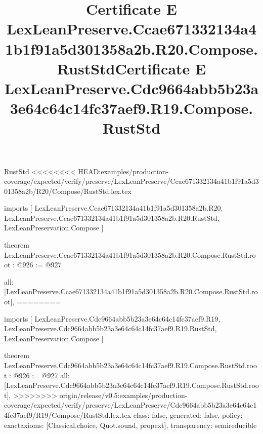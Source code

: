 \begin{lexlean}{RustStd}
<<<<<<<< HEAD:examples/production-coverage/expected/verify/preserve/LexLeanPreserve/Ccae671332134a41b1f91a5d301358a2b/R20/Compose/RustStd.lex.tex
\title{Certificate E LexLeanPreserve.Ccae671332134a41b1f91a5d301358a2b.R20.Compose.RustStd}
\begin{coremodule}
imports [
  LexLeanPreserve.Ccae671332134a41b1f91a5d301358a2b.R20,
  LexLeanPreserve.Ccae671332134a41b1f91a5d301358a2b.R20.RustStd,
  LexLeanPreservation.Compose
]

theorem LexLeanPreserve.Ccae671332134a41b1f91a5d301358a2b.R20.Compose.RustStd.root : @926 := @927 {
  all: [LexLeanPreserve.Ccae671332134a41b1f91a5d301358a2b.R20.Compose.RustStd.root],
========
\title{Certificate E LexLeanPreserve.Cdc9664abb5b23a3e64c64c14fc37aef9.R19.Compose.RustStd}
\begin{coremodule}
imports [
  LexLeanPreserve.Cdc9664abb5b23a3e64c64c14fc37aef9.R19,
  LexLeanPreserve.Cdc9664abb5b23a3e64c64c14fc37aef9.R19.RustStd,
  LexLeanPreservation.Compose
]

theorem LexLeanPreserve.Cdc9664abb5b23a3e64c64c14fc37aef9.R19.Compose.RustStd.root : @926 := @927 {
  all: [LexLeanPreserve.Cdc9664abb5b23a3e64c64c14fc37aef9.R19.Compose.RustStd.root],
>>>>>>>> origin/release/v0.5:examples/production-coverage/expected/verify/preserve/LexLeanPreserve/Cdc9664abb5b23a3e64c64c14fc37aef9/R19/Compose/RustStd.lex.tex
  class: false,
  generated: false,
  policy: exact{axioms: [Classical.choice, Quot.sound, propext]},
  transparency: semireducible
}


\end{coremodule}}
\end{coremodule}
\end{lexlean}
